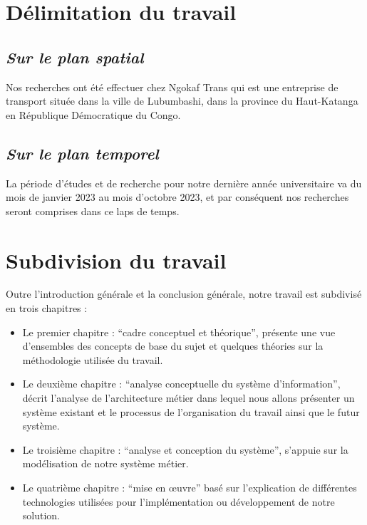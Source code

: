     \section[Délimitation du travail]{Délimitation du travail}
        \subsection[Sur le plan spatial]{\textit{Sur le plan spatial}}
        Nos recherches ont été effectuer chez Ngokaf Trans qui est une entreprise de transport
        située dans la ville de Lubumbashi, dans la province du Haut-Katanga en République Démocratique du Congo.
        \subsection[Sur le plan temporel]{\textit{Sur le plan temporel}}
        La période d’études et de recherche pour notre dernière 
        année universitaire va du mois de janvier 2023 au mois d’octobre 2023,
        et par conséquent nos recherches seront comprises dans ce laps de temps.
    \section[Subdivision du travail]{Subdivision du travail}
    Outre l’introduction générale et la conclusion générale, notre travail est subdivisé
    en trois chapitres :
    \par
        \begin{itemize}
            \setlength{\itemsep}{0pt}
            \item [\ding{226}] Le premier chapitre : \enquote{cadre conceptuel et théorique}, présente une vue
            d’ensembles des concepts de base du sujet et quelques théories sur la méthodologie
            utilisée du travail.
            \item [\ding{226}] Le deuxième chapitre : \enquote{analyse conceptuelle du système d’information}, 
            décrit l’analyse de l’architecture métier dans lequel nous allons présenter un système existant
            et le processus de l’organisation du travail ainsi que le futur système.
            \item [\ding{226}] Le troisième chapitre : \enquote{analyse et conception du système}, s’appuie sur la
            modélisation de notre système métier.          
            \item [\ding{226}] Le quatrième chapitre : \enquote{mise en œuvre} basé sur l’explication de différentes
            technologies utilisées pour l’implémentation ou développement de notre solution.
        \end{itemize} 
